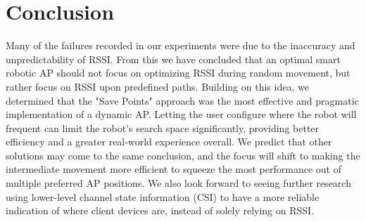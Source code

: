 \section{Conclusion}
Many of the failures recorded in our experiments were due to the inaccuracy and unpredictability of RSSI. From this we have concluded that an optimal smart robotic AP should not focus on optimizing RSSI during random movement, but rather focus on RSSI upon predefined paths. Building on this idea, we determined that the "Save Points" approach was the most effective and pragmatic implementation of a dynamic AP. Letting the user configure where the robot will frequent can limit the robot’s search space significantly, providing better efficiency and a greater real-world experience overall. We predict that other solutions may come to the same conclusion, and the focus will shift to making the intermediate movement more efficient to squeeze the most performance out of multiple preferred AP positions. We also look forward to seeing further research using lower-level channel state information (CSI) to have a more reliable indication of where client devices are, instead of solely relying on RSSI.
